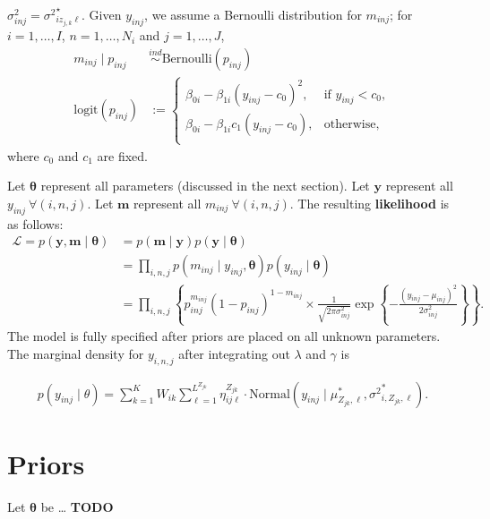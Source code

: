 \documentclass[12pt]{article}
\newcommand{\p}[1]{\left(#1\right)}
\newcommand{\bc}[1]{ \left\{#1\right\} }
\newcommand{\N}{ \mathcal{N} }
\newcommand{\ind}{\overset{ind}{\sim}}
\def\logit{\text{logit}}
\def\Bern{\text{Bernoulli}}
\def\N{\text{Normal}}
\def\btheta{\bm{\theta}}
\def\y{\bm{y}}
\newcommand\m{\bm{m}}
\begin{document}
$\sigma^2_{inj} = {\sigma^{2}}^\star_{iz_{j,k}\ell}$. Given
$y_{inj}$, we assume a Bernoulli distribution for $m_{inj}$; for
$i=1, \ldots, I$, $n=1, \ldots, N_i$ and $j=1, \ldots, J$,
%
\begin{align*}
  m_{inj} \mid p_{inj} &\ind \Bern(p_{inj}) \\
  \logit(p_{inj}) &:= \begin{cases}
  \beta_{0i} - \beta_{1i}(y_{inj}-c_0)^2, & \text{if } y_{inj} < c_0\nonumber, \\
  \beta_{0i} - \beta_{1i}c_1\p{y_{inj}-c_0}, & \text{otherwise}, \nonumber \\
  \end{cases}
\end{align*}
where $c_0$ and $c_1$ are fixed.

Let $\btheta$ represent all parameters (discussed in the next
section). Let $\y$ represent all $y_{inj} ~ \forall(i,n,j)$. Let
$\m$ represent all $m_{inj} ~ \forall(i,n,j)$. The resulting \textbf{likelihood} is as follows:
\begin{align}
\mathcal{L} = p(\y, \m \mid \btheta) &= p(\m \mid \y) p(\y \mid \btheta) \nonumber\\
&= \prod_{i,n,j} p(m_{inj} \mid y_{inj}, \btheta) p(y_{inj} \mid \btheta) \nonumber\\
&= \prod_{i,n,j} \bc{
  p_{inj}^{m_{inj}} (1-p_{inj})^{1-m_{inj}} \times 
   \frac{1}{\sqrt{2\pi\sigma^2_{inj}}} \exp\bc{-\frac{(y_{inj}-\mu_{inj})^2}{2\sigma^2_{inj}}}
}.
\end{align}
The model is fully specified after priors are placed on all unknown
parameters. The marginal density for $y_{i,n,j}$ after integrating out
$\lambda$ and $\gamma$ is

\begin{align}
p(y_{inj} \mid \theta) = \sum_{k=1}^K W_{ik} \sum_{\ell=1}^{L^{Z_{jk}}}
\eta^{Z_{jk}}_{ij\ell} \cdot \N(y_{inj} \mid \mu^*_{Z_{jk}, \ell}, {\sigma^2}^*_{i,Z_{jk},\ell}).
\end{align}

\section{Priors}\label{priors}

Let $\bm\theta$ be \ldots{} \textbf{TODO}
\end{document}
